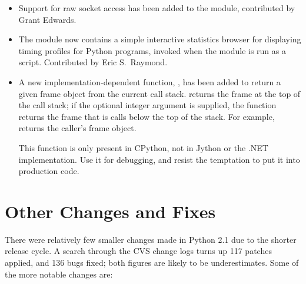 \documentclass{howto}
\begin{document}
\begin{itemize}
\item Support for raw socket access has been added to the
 module, contributed by Grant Edwards.

\item The  module now contains a simple interactive
statistics browser for displaying timing profiles for Python programs,
invoked when the module is run as a script.  Contributed by 
Eric S.\ Raymond.

\item A new implementation-dependent function, ,
has been added to return a given frame object from the current call stack.
 returns the frame at the top of the call stack; 
if the optional integer argument  is supplied, the function returns the frame
that is  calls below the top of the stack.  For example, 
returns the caller's frame object.

This function is only present in CPython, not in Jython or the .NET
implementation.  Use it for debugging, and resist the temptation to
put it into production code.



\end{itemize}

\section{Other Changes and Fixes}

There were relatively few smaller changes made in Python 2.1 due to
the shorter release cycle.  A search through the CVS change logs turns
up 117 patches applied, and 136 bugs fixed; both figures are likely to
be underestimates.  Some of the more notable changes are:
\end{document}
